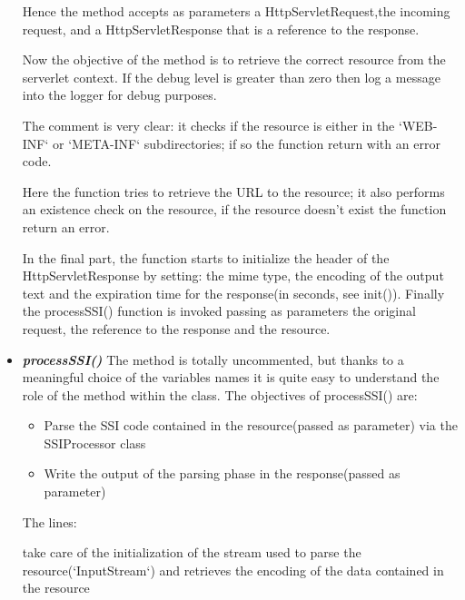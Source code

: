 \documentclass[11pt,titlepage]{article} %
\begin{document}
\begin{itemize}
      
      
      Hence the method accepts as parameters a HttpServletRequest,the incoming request, and a HttpServletResponse that is a reference
      to the response.\newline
      
      Now the objective of the method is to retrieve the correct resource from the serverlet context.
      If the debug level is greater than zero then log a message into the logger for debug purposes.
      

      The comment is very clear: it checks if the resource is either in the `WEB-INF` or `META-INF` subdirectories;
      if so the function return with an error code.
      
      
      Here the function tries to retrieve the URL to the resource; it also performs an existence check on the resource,
      if the resource doesn't exist the function return an error.
      
      
      In the final part, the function starts to initialize the header of the HttpServletResponse by setting:
      the mime type, the encoding of the output text and the expiration time for the response(in seconds, see init()).\newline
      Finally the processSSI() function is invoked passing as parameters the original request, the reference to the response and the resource.
      
      \newpage
      
    \item \textbf{\textit{processSSI()}}
      The method is totally uncommented, but thanks to a meaningful choice of the variables names it is quite easy to understand
      the role of the method within the class.
      The objectives of processSSI() are:
	\begin{itemize}
	  \item Parse the SSI code contained in the resource(passed as parameter) via the SSIProcessor class
	  \item Write the output of the parsing phase in the response(passed as parameter)
	\end{itemize}
      The lines:
	
      take care of the initialization of the stream used to parse the resource(`InputStream`) and retrieves the encoding
      of the data contained in the resource
      

\end{itemize}
\end{document}
